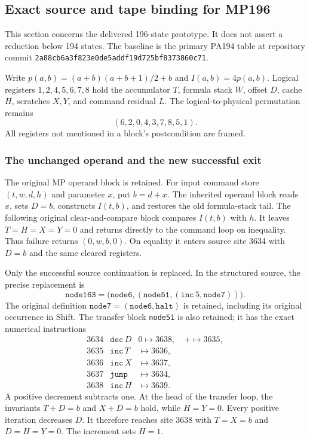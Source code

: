 \subsection{Exact source and tape binding for MP196}

This section concerns the delivered 196-state prototype. It does not
assert a reduction below 194 states. The baseline is the primary PA194
table at repository commit
\texttt{2a88cb6a3f823e0de5addf19d725bf8373860c71}.

Write $p(a,b)=(a+b)(a+b+1)/2+b$ and $I(a,b)=4p(a,b)$.
Logical registers $1,2,4,5,6,7,8$ hold the accumulator $T$, formula stack
$W$, offset $D$, cache $H$, scratches $X,Y$, and command residual $L$.
The logical-to-physical permutation remains
\[
 (6,2,0,4,3,7,8,5,1).
\]
All registers not mentioned in a block's postcondition are framed.

\subsubsection{The unchanged operand and the new successful exit}

The original MP operand block is retained. For input command store
$(t,w,d,h)$ and parameter $x$, put $b=d+x$. The inherited operand block
reads $x$, sets $D=b$, constructs $I(t,b)$, and restores the old
formula-stack tail. The following original clear-and-compare block
compares $I(t,b)$ with $h$. It leaves $T=H=X=Y=0$ and returns directly
to the command loop on inequality. Thus failure returns $(0,w,b,0)$.
On equality it enters source site 3634 with $D=b$ and the same cleared
registers.

Only the successful source continuation is replaced. In the structured
source, the precise replacement is
\[
 \mathtt{node163}
 =\bigl(\mathtt{node6},
     (\mathtt{node51},(\mathtt{inc}\,5,\mathtt{node7}))\bigr).
\]
The original definition
$\mathtt{node7}=(\mathtt{node6},\mathtt{halt})$ is retained, including
its original occurrence in Shift. The transfer block \texttt{node51}
is also retained; it has the exact numerical instructions
\[
\begin{array}{rll}
3634&\mathtt{dec}\,D&0\mapsto3638,\quad +\mapsto3635,\\
3635&\mathtt{inc}\,T&\mapsto3636,\\
3636&\mathtt{inc}\,X&\mapsto3637,\\
3637&\mathtt{jump}&\mapsto3634,\\
3638&\mathtt{inc}\,H&\mapsto3639.
\end{array}
\]
A positive decrement subtracts one. At the head of the transfer loop,
the invariants $T+D=b$ and $X+D=b$ hold, while $H=Y=0$.
Every positive iteration decreases $D$. It therefore reaches site 3638
with $T=X=b$ and $D=H=Y=0$. The increment sets $H=1$.

